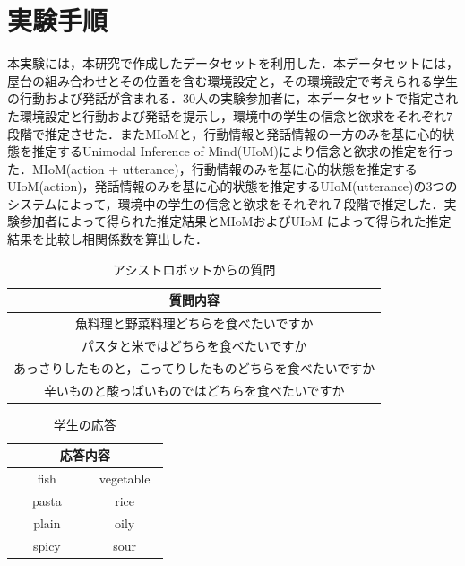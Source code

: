 \section{実験手順}

\par
本実験には，本研究で作成したデータセットを利用した．本データセットには，屋台の組み合わせとその位置を含む環境設定と，その環境設定で考えられる学生の行動および発話が含まれる．30人の実験参加者に，本データセットで指定された環境設定と行動および発話を提示し，環境中の学生の信念と欲求をそれぞれ7段階で推定させた．またMIoMと，行動情報と発話情報の一方のみを基に心的状態を推定するUnimodal Inference of Mind(UIoM)により信念と欲求の推定を行った．MIoM(action + utterance)，行動情報のみを基に心的状態を推定するUIoM(action)，発話情報のみを基に心的状態を推定するUIoM(utterance)の3つのシステムによって，環境中の学生の信念と欲求をそれぞれ７段階で推定した．実験参加者によって得られた推定結果とMIoMおよびUIoM によって得られた推定結果を比較し相関係数を算出した．

\begin{table}[htb]
  \begin{center}
  \caption{アシストロボットからの質問}
  \label{tab:question}
  \begin{tabular}{c} \hline
    質問内容\\\hline
    魚料理と野菜料理どちらを食べたいですか\\
    パスタと米ではどちらを食べたいですか\\
    あっさりしたものと，こってりしたものどちらを食べたいですか\\
    辛いものと酸っぱいものではどちらを食べたいですか\\\hline
  \end{tabular}
\end{center}
\end{table}

\begin{table}[htb]
  \begin{center}
  \caption{学生の応答}
  \label{tab:answer}
  \begin{tabular}{cc} \hline
    \multicolumn{2}{c}{応答内容}\\\hline
    　fish　&　vegetable　\\
    　pasta　&　rice　\\
    　plain　&　oily　\\
    　spicy　&　sour　\\\hline
  \end{tabular}
\end{center}
\end{table}



